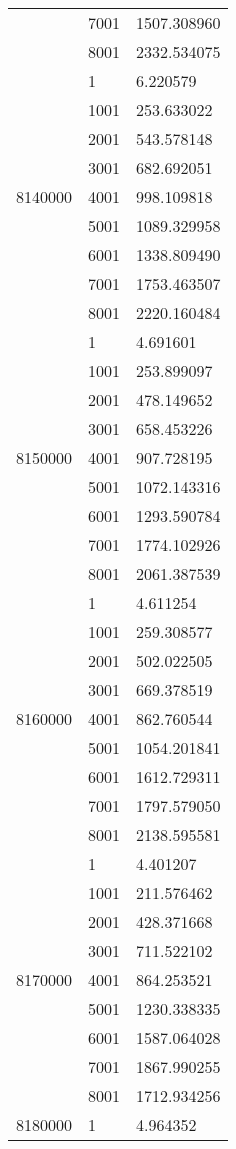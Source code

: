 \begin{table}[htb!]
\begin{tabular}{lll}
 & 7001 & 1507.308960 \\
 & 8001 & 2332.534075 \\
\multirow[c]{9}{*}{8140000} & 1 & 6.220579 \\
 & 1001 & 253.633022 \\
 & 2001 & 543.578148 \\
 & 3001 & 682.692051 \\
 & 4001 & 998.109818 \\
 & 5001 & 1089.329958 \\
 & 6001 & 1338.809490 \\
 & 7001 & 1753.463507 \\
 & 8001 & 2220.160484 \\
\multirow[c]{9}{*}{8150000} & 1 & 4.691601 \\
 & 1001 & 253.899097 \\
 & 2001 & 478.149652 \\
 & 3001 & 658.453226 \\
 & 4001 & 907.728195 \\
 & 5001 & 1072.143316 \\
 & 6001 & 1293.590784 \\
 & 7001 & 1774.102926 \\
 & 8001 & 2061.387539 \\
\multirow[c]{9}{*}{8160000} & 1 & 4.611254 \\
 & 1001 & 259.308577 \\
 & 2001 & 502.022505 \\
 & 3001 & 669.378519 \\
 & 4001 & 862.760544 \\
 & 5001 & 1054.201841 \\
 & 6001 & 1612.729311 \\
 & 7001 & 1797.579050 \\
 & 8001 & 2138.595581 \\
\multirow[c]{9}{*}{8170000} & 1 & 4.401207 \\
 & 1001 & 211.576462 \\
 & 2001 & 428.371668 \\
 & 3001 & 711.522102 \\
 & 4001 & 864.253521 \\
 & 5001 & 1230.338335 \\
 & 6001 & 1587.064028 \\
 & 7001 & 1867.990255 \\
 & 8001 & 1712.934256 \\
\multirow[c]{9}{*}{8180000} & 1 & 4.964352 \\

\end{tabular}
\end{table}
